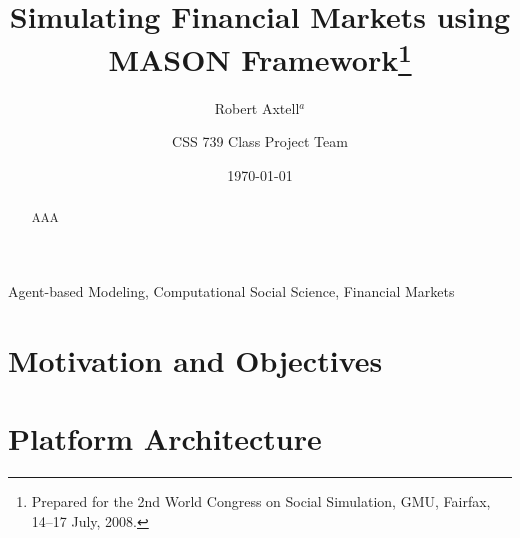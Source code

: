 \documentclass[runningheads]{llncs}
\newcommand{\keywords}[1]{\par\addvspace\baselineskip
\noindent\keywordname\enspace\ignorespaces#1}
\begin{document}
\mainmatter

\title{Simulating Financial Markets using MASON Framework\thanks{Prepared for the 2nd World Congress on Social Simulation, GMU, Fairfax, 14--17 July, 2008.}}


\author{Robert Axtell$^{a}$ \and CSS 739 Class Project Team}





\date{\today}
\maketitle
\begin{abstract}
AAA
\end{abstract}

\keywords{Agent-based Modeling, Computational Social Science, Financial Markets}

\section{Motivation and Objectives}


\section{Platform Architecture}
\end{document}
